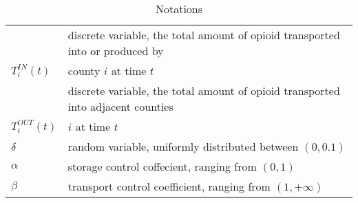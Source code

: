 \begin{table}[H]
\begin{tabular}{|l|l|}
 & discrete variable, the total amount of opioid transported into or produced by\\ $T_i^{IN}(t)$ & county $i$ at time $t$ \\ \hline
 & discrete variable, the total amount of opioid transported into adjacent counties\\$T_i^{OUT}(t)$ & $i$ at time $t$ \\ \hline
 $\delta$ & random variable, uniformly distributed between $(0,0.1)$\\ \hline
 $\alpha$ & storage control coffecient, ranging from $(0,1)$\\ \hline 
 $\beta$ & transport control coefficient, ranging from $(1, +\infty)$\\ \hline
\end{tabular}
\caption{Notations}
\end{table}
